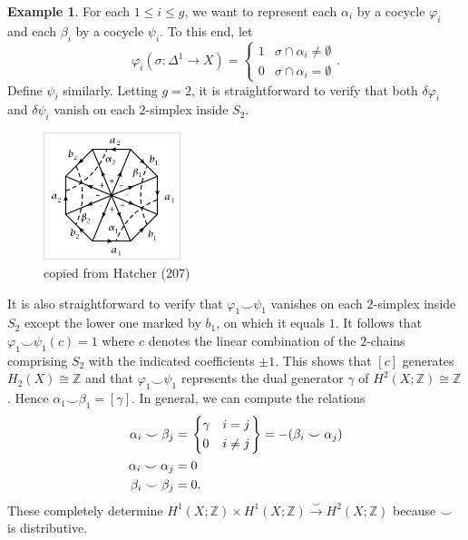 \documentclass[10pt,letterpaper,cm]{nupset}
\theoremstyle{definition}
\newtheorem{exmp}[definition]{Example}
\theoremstyle{theorem}
\theoremstyle{remark}
\newcommand{\Z}{\mathbb Z}
\newcommand{\1}{\mathbb{1}}
\newcommand{\0}{\vec 0}
\begin{document}
\begin{exmp}
For each $1\leq i\leq g$, we want to represent each $\alpha_i$ by a cocycle $\varphi_i$ and each $\beta_i$ by a cocycle $\psi_i$. To this end, let $$\varphi_i(\sigma : \Delta^1 \to X) = \begin{cases} 1 & \sigma \cap \alpha_i \ne \emptyset \\ 0 & \sigma \cap \alpha_i = \emptyset     \end{cases}.$$ Define $\psi_i$ similarly. Letting $g=2$, it is straightforward to verify that both $\delta{\varphi_i}$ and $\delta{\psi_i}$ vanish on each $2$-simplex inside $S_2$.
\begin{figure}[H]
\centering
\includegraphics[width=40mm]{cup-prod-Sg.png}
\caption{copied from Hatcher (207) \label{overflow}}
\end{figure}
It is also straightforward to verify that $\varphi_1 \smile \psi_1$ vanishes on each $2$-simplex inside $S_2$ except the lower one marked by $b_1$, on which it equals $1$.
It follows that $\varphi_1 \smile \psi_1(c) =1$ where $c$ denotes the linear combination of the $2$-chains comprising $S_2$ with the indicated coefficients $\pm 1$. This shows that $[c]$ generates $H_2(X) \cong \Z$ and that $\varphi_1\smile \psi_1$ represents the dual generator $\gamma$ of $H^2(X; \Z) \cong \Z$. Hence $\alpha_1 \smile \beta_1 = [\gamma]$. In general, we can compute the relations
\begin{align*}
  \alpha_i \smile \beta_j & = 
  \begin{rcases}
    \begin{dcases}
   \gamma & i =j \\ 0 & i \ne j  
      \end{dcases}
  \end{rcases}
   =  {-}(\beta_i \smile \alpha_j)
 \\  \alpha_i \smile \alpha_j & =0
 \\  \beta_i \smile \beta_j & =0
. \end{align*} These completely determine $H^1(X; \Z) \times H^1(X; \Z) \overset{\smile}{\longrightarrow} H^2(X; \Z)$ because $\smile$ is distributive.
\end{exmp}
\end{document}
